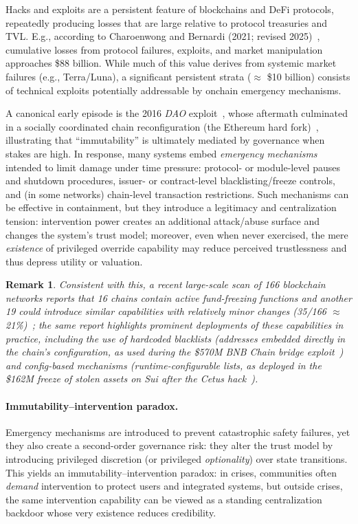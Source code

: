 \documentclass[12pt]{article}
\newtheorem{remark}{Remark}
\begin{document}
Hacks and exploits are a persistent feature of blockchains and DeFi protocols, repeatedly producing losses that are large relative to protocol treasuries and TVL.
%
E.g., according to Charoenwong and Bernardi (2021; revised 2025)~\cite{CharoenwongBernardi2021Hacks}, cumulative losses from protocol failures, exploits, and market manipulation approaches \$88 billion. While much of this value derives from systemic market failures (e.g., Terra/Luna), a significant persistent strata ($\approx$ \$10 billion) consists of technical exploits potentially addressable by onchain emergency mechanisms.

A canonical early episode is the 2016 \emph{DAO} exploit~\cite{TheDAO2016}, whose aftermath culminated in a socially coordinated chain reconfiguration (the Ethereum hard fork)~\cite{EthereumDAOFork2016}, illustrating that ``immutability'' is ultimately mediated by governance when stakes are high.
In response, many systems embed \emph{emergency mechanisms} intended to limit damage under time pressure: protocol- or module-level pauses and shutdown procedures, issuer- or contract-level blacklisting/freeze controls, and (in some networks) chain-level transaction restrictions.
Such mechanisms can be effective in containment, but they introduce a legitimacy and centralization tension: intervention power creates an additional attack/abuse surface and changes the system's trust model; moreover, even when never exercised, the mere \emph{existence} of privileged override capability may reduce perceived trustlessness and thus depress utility or valuation.

\begin{remark}
%
Consistent with this, a recent large-scale scan of 166 blockchain networks reports that 16 chains contain active fund-freezing functions and another 19 could introduce similar capabilities with relatively minor changes (35/166 $\approx$ 21\%)~\cite{ByBit2025SecurityReport}; the same report highlights prominent deployments of these capabilities in practice, including the use of \emph{hardcoded} blacklists (addresses embedded directly in the chain's configuration, as used during the \$570M BNB Chain bridge exploit~\cite{BNBChainResponse}) and \emph{config-based} mechanisms (runtime-configurable lists, as deployed in the \$162M freeze of stolen assets on Sui after the Cetus hack~\cite{SuiCetusVote}).
%
\end{remark}

\paragraph{Immutability--intervention paradox.}
Emergency mechanisms are introduced to prevent catastrophic safety failures, yet they also create a second-order governance risk:
they alter the trust model by introducing privileged discretion (or privileged \emph{optionality}) over state transitions.
This yields an immutability--intervention paradox: in crises, communities often \emph{demand} intervention to protect users and integrated systems,
but outside crises, the same intervention capability can be viewed as a standing centralization backdoor whose very existence reduces credibility.
\end{document}
